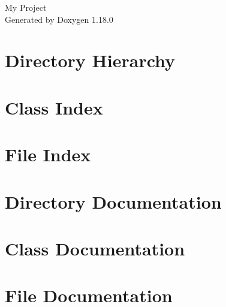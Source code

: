 \documentclass[twoside]{book}
\newcommand{\+}{\discretionary{\mbox{\scriptsize$\hookleftarrow$}}{}{}}
\newcommand{\clearemptydoublepage}{%
    \newpage{\pagestyle{empty}\cleardoublepage}%
  }
\begin{document}
  \raggedbottom
    \hypersetup{pageanchor=false,
                bookmarksnumbered=true,
                pdfencoding=unicode
               }
  \begin{titlepage}
  \vspace*{7cm}
  \begin{center}%
  {\Large My Project}\\
  \vspace*{1cm}
  {\large Generated by Doxygen 1.18.0}\\
  \end{center}
  \end{titlepage}
  \clearemptydoublepage
  \tableofcontents
  \clearemptydoublepage
  \hypersetup{pageanchor=true}
\chapter{Directory Hierarchy}

\chapter{Class Index}

\chapter{File Index}

\chapter{Directory Documentation}


\chapter{Class Documentation}







\chapter{File Documentation}


















  \backmatter
  \newpage
  \clearemptydoublepage
  \printindex
\end{document}
